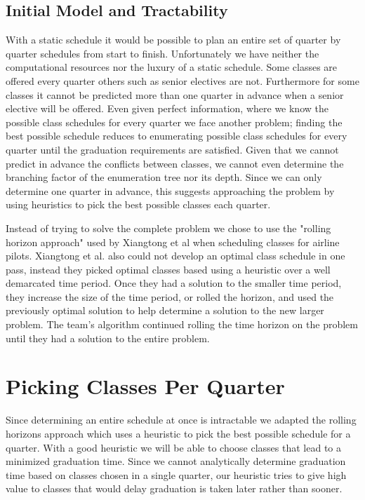 \documentclass[11pt]{article} %
\begin{document}
\subsection{Initial Model and Tractability} With a static schedule it would be
possible to plan an entire set of quarter by quarter schedules from start to
finish. Unfortunately we have neither the computational resources nor the luxury
of a static schedule. Some classes are offered every quarter others such as
senior electives are not. Furthermore for some classes it cannot be predicted
more than one quarter in advance when a senior elective will be offered. Even
given perfect information, where we know the possible class schedules for every
quarter we face another problem; finding the best possible schedule reduces to
enumerating possible class schedules for every quarter until the graduation
requirements are satisfied.  Given that we cannot predict in advance the
conflicts between classes, we cannot even determine the branching factor of the
enumeration tree nor its depth. Since we can only determine one quarter in
advance, this suggests approaching the problem by using heuristics to pick the
best possible classes each quarter.

Instead of trying to solve the complete problem we chose to use the "rolling
horizon approach" used by Xiangtong et al \cite{xiangton:informs} when
scheduling classes for airline pilots. Xiangtong et al. also could not develop
an optimal class schedule in one pass, instead they picked optimal classes based
using a heuristic over a well demarcated time period. Once they had a solution
to the smaller time period, they increase the size of the time period, or rolled
the horizon, and used the previously optimal solution to help determine
a solution to the new larger problem. The team's algorithm continued rolling the
time horizon on the problem until they had a solution to the entire problem.

\section{Picking Classes Per Quarter} Since determining an entire schedule at
once is intractable we adapted the rolling horizons approach which uses
a heuristic to pick the best possible schedule for a quarter. With a good
heuristic we will be able to choose classes that lead to a minimized graduation
time. Since we cannot analytically determine graduation time based on classes
chosen in a single quarter, our heuristic tries to give high value to classes
that would delay graduation is taken later rather than sooner. 
\end{document}
